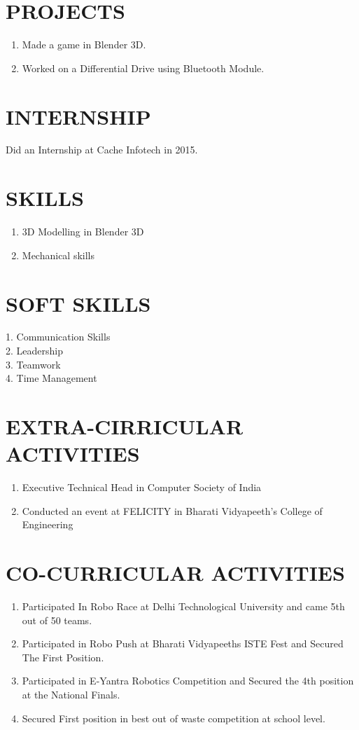 \documentclass{article}
\begin{document}
\section{PROJECTS}
\Large
\begin{enumerate}
\item Made a game in Blender 3D. 

\item Worked on a Differential Drive using Bluetooth Module.
\end{enumerate}

\section{INTERNSHIP}
Did an Internship at Cache Infotech in 2015.

\section{SKILLS}
\begin{enumerate}
\item 3D Modelling in Blender 3D
\item Mechanical skills
\end{enumerate}

\section{SOFT SKILLS}
1. Communication Skills\\
2. Leadership\\
3. Teamwork\\
4. Time Management\\

\section{EXTRA-CIRRICULAR ACTIVITIES}
\begin{enumerate}
\item Executive Technical Head in Computer Society of India
\item Conducted an event at FELICITY in Bharati Vidyapeeth's College of Engineering
\end{enumerate}

\section{CO-CURRICULAR ACTIVITIES}
\begin{enumerate}
\item Participated In Robo Race at Delhi Technological University and came 5th out of 50 teams.
\item Participated in Robo Push at Bharati Vidyapeeths ISTE Fest and Secured The First Position.
\item Participated in E-Yantra Robotics Competition and Secured the 4th position at the National Finals.
\item Secured First position in best out of waste competition at school level.
\end{enumerate}
\end{document}
